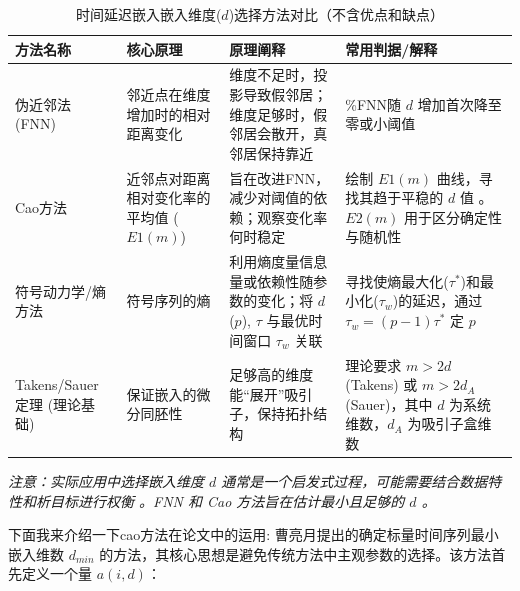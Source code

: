 \begin{table}[h!] %
    \centering %
    \caption{时间延迟嵌入嵌入维度($d$)选择方法对比（不含优点和缺点）}
    \label{tab:embedding_dimension_methods_no_pros_cons}
    \begin{tabular}{
      >{\raggedright\arraybackslash}m{3cm} %
      >{\raggedright\arraybackslash}m{4.5cm} %
      >{\raggedright\arraybackslash}m{5cm}  %
      >{\raggedright\arraybackslash}m{4cm}  %
    }
    \toprule %
    \textbf{方法名称} & \textbf{核心原理}  & \textbf{原理阐释}  & \textbf{常用判据/解释} \\
    \midrule %
    
    伪近邻法 (FNN) \cite{rhodes1997false}& 邻近点在维度增加时的相对距离变化  & 维度不足时，投影导致假邻居；维度足够时，假邻居会散开，真邻居保持靠近  & \%FNN随 $d$ 增加首次降至零或小阈值  \\
    \addlinespace %
    
    Cao方法\cite{cao1997practical} & 近邻点对距离相对变化率的平均值 ($E1(m)$)  & 旨在改进FNN，减少对阈值的依赖；观察变化率何时稳定  & 绘制 $E1(m)$ 曲线，寻找其趋于平稳的 $d$ 值 。$E2(m)$ 用于区分确定性与随机性  \\
    \addlinespace
    
    符号动力学/熵方法\cite{matilla2021selection} & 符号序列的熵  & 利用熵度量信息量或依赖性随参数的变化；将 $d$ ($p$), $τ$ 与最优时间窗口 $\tau_w$ 关联  & 寻找使熵最大化($\tau^*$)和最小化($\tau_w$)的延迟，通过 $\tau_w=(p-1)\tau^*$ 定 $p$  \\
    \addlinespace
    
    Takens/Sauer 定理 (理论基础) & 保证嵌入的微分同胚性  & 足够高的维度能“展开”吸引子，保持拓扑结构  & 理论要求 $m > 2d$ (Takens) 或 $m > 2d_A$ (Sauer)，其中 $d$ 为系统维数，$d_A$ 为吸引子盒维数 \\
    
    \bottomrule %
    \end{tabular}
    \par %
    \vspace{0.5cm} %
    \textit{注意：实际应用中选择嵌入维度 $d$ 通常是一个启发式过程，可能需要结合数据特性和析目标进行权衡 。FNN 和 Cao 方法旨在估计最小且足够的 $d$ 。}
    \end{table}
下面我来介绍一下cao方法在论文中的运用:
曹亮月\cite{cao1997practical}提出的确定标量时间序列最小嵌入维数 $d_{min}$ 的方法，其核心思想是避免传统方法中主观参数的选择。该方法首先定义一个量 $a(i,d)$：
